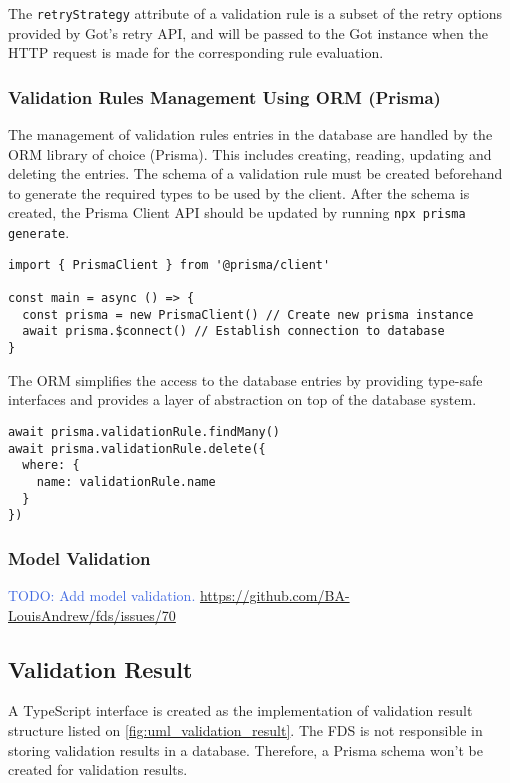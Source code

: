       The \verb;retryStrategy; attribute of a validation rule is a subset of the retry options provided by Got's retry API, and will be passed to the Got instance when the HTTP request is made for the corresponding rule evaluation. 

    \subsubsection{Validation Rules Management Using ORM (Prisma)} 
      The management of validation rules entries in the database are handled by the ORM library of choice (Prisma). This includes creating, reading, updating and deleting the entries. The schema of a validation rule must be created beforehand to generate the required types to be used by the client. After the schema is created, the Prisma Client API should be updated by running \verb;npx prisma generate;. 

      \begin{lstlisting}[style=es6, caption={Establishing database connection with Prisma (TypeScript)}]
import { PrismaClient } from '@prisma/client'

const main = async () => {
  const prisma = new PrismaClient() // Create new prisma instance
  await prisma.$connect() // Establish connection to database
}
      \end{lstlisting}  

      The ORM simplifies the access to the database entries by providing type-safe interfaces and provides a layer of abstraction on top of the database system. 

      \begin{lstlisting}[style=es6, caption={Example usage of Prisma (TypeScript)}]
await prisma.validationRule.findMany()
await prisma.validationRule.delete({
  where: {
    name: validationRule.name
  }
})
      \end{lstlisting}

    \subsubsection{Model Validation}
      \textcolor{royalblue}{TODO: Add model validation. \url{https://github.com/BA-LouisAndrew/fds/issues/70}}

  \subsection{Validation Result}
  
    A TypeScript interface is created as the implementation of validation result structure listed on \autoref{fig:uml_validation_result}. The FDS is not responsible in storing validation results in a database. Therefore, a Prisma schema won't be created for validation results. 


